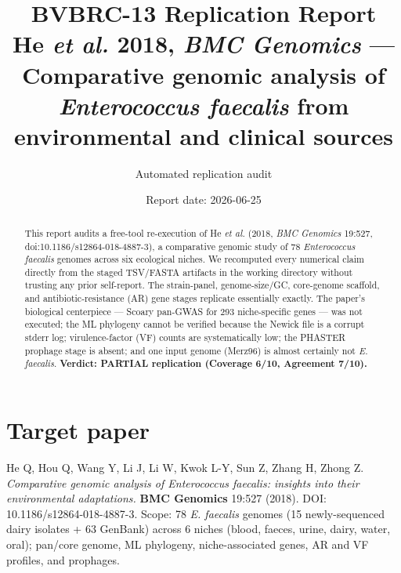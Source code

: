 \documentclass[11pt]{article}
\title{BVBRC-13 Replication Report\\
\large He \emph{et al.} 2018, \emph{BMC Genomics} --- Comparative genomic analysis of \emph{Enterococcus faecalis} from environmental and clinical sources}
\author{Automated replication audit}
\date{Report date: 2026-06-25}
\begin{document}
\maketitle

\begin{abstract}
This report audits a free-tool re-execution of He \emph{et al.} (2018, \emph{BMC Genomics} 19:527, doi:10.1186/s12864-018-4887-3), a comparative genomic study of 78 \emph{Enterococcus faecalis} genomes across six ecological niches. We recomputed every numerical claim directly from the staged TSV/FASTA artifacts in the working directory without trusting any prior self-report. The strain-panel, genome-size/GC, core-genome scaffold, and antibiotic-resistance (AR) gene stages replicate essentially exactly. The paper's biological centerpiece --- Scoary pan-GWAS for 293 niche-specific genes --- was not executed; the ML phylogeny cannot be verified because the Newick file is a corrupt stderr log; virulence-factor (VF) counts are systematically low; the PHASTER prophage stage is absent; and one input genome (Merz96) is almost certainly not \emph{E. faecalis}. \textbf{Verdict: PARTIAL replication (Coverage 6/10, Agreement 7/10).}
\end{abstract}

\section{Target paper}
He Q, Hou Q, Wang Y, Li J, Li W, Kwok L-Y, Sun Z, Zhang H, Zhong Z. \emph{Comparative genomic analysis of \emph{Enterococcus faecalis}: insights into their environmental adaptations.} \textbf{BMC Genomics} 19:527 (2018). DOI: 10.1186/s12864-018-4887-3. Scope: 78 \emph{E. faecalis} genomes (15 newly-sequenced dairy isolates + 63 GenBank) across 6 niches (blood, faeces, urine, dairy, water, oral); pan/core genome, ML phylogeny, niche-associated genes, AR and VF profiles, and prophages.
\end{document}
